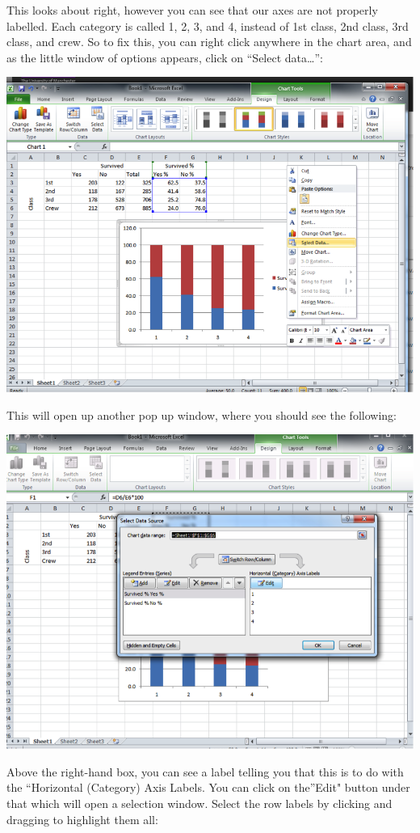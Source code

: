 \documentclass[]{book}
\theoremstyle{definition}
\theoremstyle{definition}
\theoremstyle{definition}
\theoremstyle{remark}
\begin{document}
This looks about right, however you can see that our axes are not
properly labelled. Each category is called 1, 2, 3, and 4, instead of
1st class, 2nd class, 3rd class, and crew. So to fix this, you can right
click anywhere in the chart area, and as the little window of options
appears, click on ``Select data\ldots{}'':

\includegraphics{imgs/stacked_col_3.png}

This will open up another pop up window, where you should see the
following:

\includegraphics{imgs/stacked_col_4.png}

Above the right-hand box, you can see a label telling you that this is
to do with the ``Horizontal (Category) Axis Labels. You can click on
the''Edit" button under that which will open a selection window. Select
the row labels by clicking and dragging to highlight them all:
\end{document}
